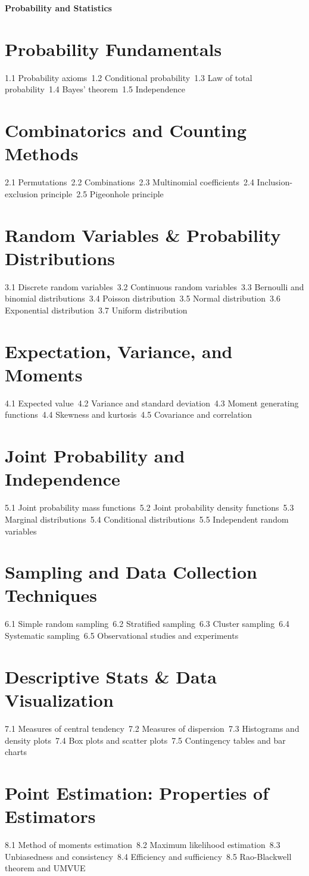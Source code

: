{\LARGE \bf{Probability and Statistics}}
\section{Probability Fundamentals}
1.1 Probability axioms\
1.2 Conditional probability\
1.3 Law of total probability\
1.4 Bayes' theorem\
1.5 Independence\
\section{Combinatorics and Counting Methods}
2.1 Permutations\
2.2 Combinations\
2.3 Multinomial coefficients\
2.4 Inclusion-exclusion principle\
2.5 Pigeonhole principle\
\section{Random Variables \& Probability Distributions}
3.1 Discrete random variables\
3.2 Continuous random variables\
3.3 Bernoulli and binomial distributions\
3.4 Poisson distribution\
3.5 Normal distribution\
3.6 Exponential distribution\
3.7 Uniform distribution\
\section{Expectation, Variance, and Moments}
4.1 Expected value\
4.2 Variance and standard deviation\
4.3 Moment generating functions\
4.4 Skewness and kurtosis\
4.5 Covariance and correlation\
\section{Joint Probability and Independence}
5.1 Joint probability mass functions\
5.2 Joint probability density functions\
5.3 Marginal distributions\
5.4 Conditional distributions\
5.5 Independent random variables\
\section{Sampling and Data Collection Techniques}
6.1 Simple random sampling\
6.2 Stratified sampling\
6.3 Cluster sampling\
6.4 Systematic sampling\
6.5 Observational studies and experiments\
\section{Descriptive Stats \& Data Visualization}
7.1 Measures of central tendency\
7.2 Measures of dispersion\
7.3 Histograms and density plots\
7.4 Box plots and scatter plots\
7.5 Contingency tables and bar charts\
\section{Point Estimation: Properties of Estimators}
8.1 Method of moments estimation\
8.2 Maximum likelihood estimation\
8.3 Unbiasedness and consistency\
8.4 Efficiency and sufficiency\
8.5 Rao-Blackwell theorem and UMVUE\
